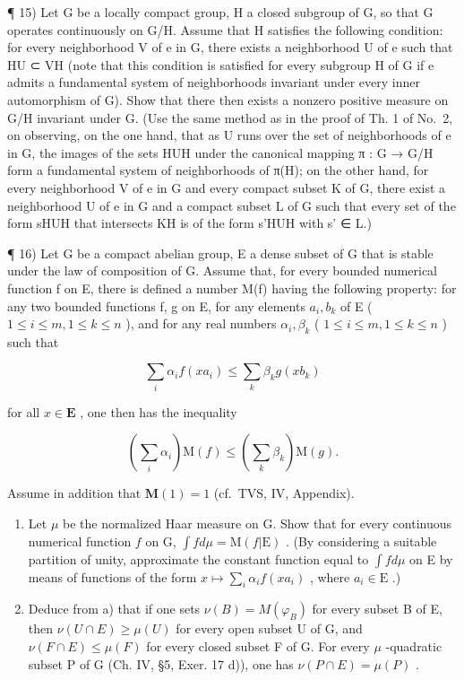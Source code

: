 ¶ 15) Let G be a locally compact group, H a closed subgroup of G, so that G operates continuously on G/H. Assume that H satisfies the following condition: for every neighborhood V of e in G, there exists a neighborhood U of e such that HU ⊂ VH (note that this condition is satisfied for every subgroup H of G if e admits a fundamental system of neighborhoods invariant under every inner automorphism of G). Show that there then exists a nonzero positive measure on G/H invariant under G. (Use the same method as in the proof of Th. 1 of No.~2, on observing, on the one hand, that as U runs over the set of neighborhoods of e in G, the images of the sets HUH under the canonical mapping π : G → G/H form a fundamental system of neighborhoods of π(H); on the other hand, for every neighborhood V of e in G and every compact subset K of G, there exist a neighborhood U of e in G and a compact subset L of G such that every set of the form sHUH that intersects KH is of the form s'HUH with s' ∈ L.)

¶ 16) Let G be a compact abelian group, E a dense subset of G that is stable under the law of composition of G. Assume that, for every bounded numerical function f on E, there is defined a number M(f) having the following property: for any two bounded functions f, g on E, for any elements \(a_{i}, b_{k}\) of E ( \(1 \leqslant i \leqslant m, 1 \leqslant k \leqslant n\) ), and for any real numbers \(\alpha_{i}, \beta_{k}\) ( \(1 \leqslant i \leqslant m, 1 \leqslant k \leqslant n\) ) such that

\[
\sum_ {i} \alpha_ {i} f (x a _ {i}) \leqslant \sum_ {k} \beta_ {k} g (x b _ {k})
\]

for all \(x \in \mathbf{E}\) , one then has the inequality

\[
\left(\sum_ {i} \alpha_ {i}\right) \mathrm{M} (f) \leqslant \left(\sum_ {k} \beta_ {k}\right) \mathrm{M} (g).
\]

Assume in addition that \(\mathbf{M}(1) = 1\) (cf.~TVS, IV, Appendix).

\begin{enumerate}
\def\labelenumi{\alph{enumi})}
\item
  Let \(\mu\) be the normalized Haar measure on G. Show that for every continuous numerical function \(f\) on G, \(\int f d\mu = \mathrm{M}(f|\mathrm{E})\) . (By considering a suitable partition of unity, approximate the constant function equal to \(\int f d\mu\) on E by means of functions of the form \(x \mapsto \sum_{i} \alpha_i f(xa_i)\) , where \(a_i \in \mathrm{E}\) .)
\item
  Deduce from a) that if one sets \(\nu(B) = M(\varphi_B)\) for every subset B of E, then \(\nu(U \cap E) \geqslant \mu(U)\) for every open subset U of G, and \(\nu(F \cap E) \leqslant \mu(F)\) for every closed subset F of G. For every \(\mu\) -quadratic subset P of G (Ch. IV, §5, Exer. 17 d)), one has \(\nu(P \cap E) = \mu(P)\) .
\end{enumerate}

